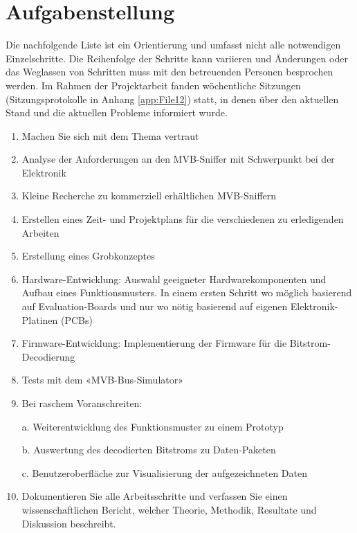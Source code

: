 
\section{Aufgabenstellung}
\label{Aufgabenstellung} %

Die nachfolgende Liste ist ein Orientierung und umfasst nicht alle notwendigen Einzelschritte. Die Reihenfolge der Schritte kann variieren und Änderungen oder das Weglassen von Schritten muss mit den betreuenden Personen besprochen werden. Im Rahmen der Projektarbeit fanden wöchentliche Sitzungen (Sitzungsprotokolle in Anhang \ref{app:File12}) statt, in denen über den aktuellen Stand und die aktuellen Probleme informiert wurde.
 \begin{enumerate}
     \item Machen Sie sich mit dem Thema vertraut
     \item Analyse der Anforderungen an den MVB-Sniffer mit Schwerpunkt bei der Elektronik 
     \item Kleine Recherche zu kommerziell erhältlichen MVB-Sniffern
     \item Erstellen eines Zeit- und Projektplans für die verschiedenen zu erledigenden Arbeiten
     \item Erstellung eines Grobkonzeptes
     \item Hardware-Entwicklung: Auswahl geeigneter Hardwarekomponenten und Aufbau eines 
     Funktionsmusters. In einem ersten Schritt wo möglich basierend auf Evaluation-Boards und nur wo 
     nötig basierend auf eigenen Elektronik-Platinen (PCBs)
     \item Firmware-Entwicklung: Implementierung der Firmware für die Bitstrom-Decodierung
     \item Tests mit dem «MVB-Bus-Simulator»
     \item Bei raschem Voranschreiten: 
     
a. Weiterentwicklung des Funktionsmuster zu einem Prototyp 

b. Auswertung des decodierten Bitstroms zu Daten-Paketen 

c. Benutzeroberfläche zur Visualisierung der aufgezeichneten Daten 
     \item Dokumentieren Sie alle Arbeitsschritte und verfassen Sie einen wissenschaftlichen Bericht, welcher Theorie, Methodik, Resultate und Diskussion beschreibt.
     \end{enumerate}

